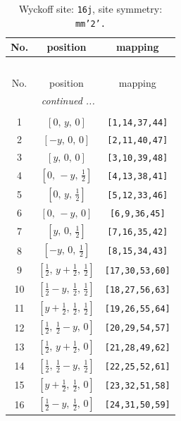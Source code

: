 \documentclass[fleqn,8pt]{jsarticle}
\begin{document}
\renewcommand{\arraystretch}{1.2}
\begin{longtable}{ccc}
\caption{Wyckoff site: {\tt 16j}, site symmetry: {\tt mm'2'.}}
 \\
 \hline \hline
No. & position & mapping \\ \hline \endfirsthead

\multicolumn{2}{l}{\tablename\ \thetable{}} \\
 \hline \hline
No. & position & mapping \\ \hline \endhead

 \hline \hline
\multicolumn{2}{r}{\footnotesize\it continued ...} \\ \endfoot

 \hline \hline
\multicolumn{2}{r}{} \\ \endlastfoot

1 & $\left[ 0,\, y,\, 0 \right]$ & {\tt [1,14,37,44]} \\ \hline
2 & $\left[ - y,\, 0,\, 0 \right]$ & {\tt [2,11,40,47]} \\ \hline
3 & $\left[ y,\, 0,\, 0 \right]$ & {\tt [3,10,39,48]} \\ \hline
4 & $\left[ 0,\, - y,\, \frac{1}{2} \right]$ & {\tt [4,13,38,41]} \\ \hline
5 & $\left[ 0,\, y,\, \frac{1}{2} \right]$ & {\tt [5,12,33,46]} \\ \hline
6 & $\left[ 0,\, - y,\, 0 \right]$ & {\tt [6,9,36,45]} \\ \hline
7 & $\left[ y,\, 0,\, \frac{1}{2} \right]$ & {\tt [7,16,35,42]} \\ \hline
8 & $\left[ - y,\, 0,\, \frac{1}{2} \right]$ & {\tt [8,15,34,43]} \\ \hline
9 & $\left[ \frac{1}{2},\, y + \frac{1}{2},\, \frac{1}{2} \right]$ & {\tt [17,30,53,60]} \\ \hline
10 & $\left[ \frac{1}{2} - y,\, \frac{1}{2},\, \frac{1}{2} \right]$ & {\tt [18,27,56,63]} \\ \hline
11 & $\left[ y + \frac{1}{2},\, \frac{1}{2},\, \frac{1}{2} \right]$ & {\tt [19,26,55,64]} \\ \hline
12 & $\left[ \frac{1}{2},\, \frac{1}{2} - y,\, 0 \right]$ & {\tt [20,29,54,57]} \\ \hline
13 & $\left[ \frac{1}{2},\, y + \frac{1}{2},\, 0 \right]$ & {\tt [21,28,49,62]} \\ \hline
14 & $\left[ \frac{1}{2},\, \frac{1}{2} - y,\, \frac{1}{2} \right]$ & {\tt [22,25,52,61]} \\ \hline
15 & $\left[ y + \frac{1}{2},\, \frac{1}{2},\, 0 \right]$ & {\tt [23,32,51,58]} \\ \hline
16 & $\left[ \frac{1}{2} - y,\, \frac{1}{2},\, 0 \right]$ & {\tt [24,31,50,59]} \\
\end{longtable}
\end{document}

